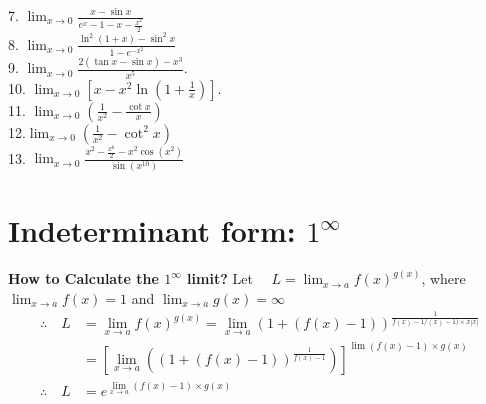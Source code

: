 7. $\lim _{x \rightarrow 0} \frac{x-\sin x}{e^x-1-x-\frac{x^2}{2}}$ \\
8. $\lim _{x \rightarrow 0} \frac{\ln ^2(1+x)-\sin ^2 x}{1-e^{-x^2}}$\\
9. $\lim _{x \rightarrow 0} \frac{2(\tan x-\sin x)-x^3}{x^5}$. \\

10. $\lim _{x \rightarrow 0}\left[x-x^2 \ln \left(1+\frac{1}{x}\right)\right]$.\\
11. $\lim _{x \rightarrow 0}\left(\frac{1}{x^2}-\frac{\cot x}{x}\right)$
\\
12.$\lim _{x \rightarrow 0}\left(\frac{1}{x^2}-\cot ^2 x\right)$\\

13. $\lim_{x \to 0}{\frac{x^2-\frac{x^6}{2}-x^2 \cos (x^2)}{\sin (x^{10})}}
$\\


\section{Indeterminant form: $1^\infty$}

\textbf{How to Calculate the $1^\infty$ limit?}
Let $\quad L=\lim _{x \rightarrow a} f(x)^{g(x)}$, where $\lim _{x \rightarrow a} f(x)=1$ and $\lim _{x \rightarrow a} g(x)=\infty$
$$
\begin{aligned}
\therefore \quad L & =\lim _{x \rightarrow a} f(x)^{g(x)}=\lim _{x \rightarrow a}(1+(f(x)-1))^{\frac{1}{f(x)-1 /(x)-1) \times x|x|}} \\
& =\left[\lim _{x \rightarrow a}\left((1+(f(x)-1))^{\frac{1}{f(x)-1}}\right)\right]^{\lim (f(x)-1) \times g(x)} \\
\therefore \quad L & =e^{\lim _{x \rightarrow a}(f(x)-1) \times g(x)}
\end{aligned}
$$

